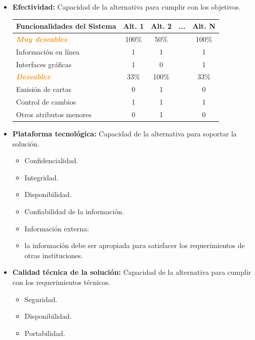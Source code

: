 \documentclass{templateNote}
\begin{document}
\begin{itemize}
    \item \textbf{Efectividad:} Capacidad de la alternativa para cumplir con los objetivos.
    \begin{table}[H]
        \centering
        \begin{tabular}{|>{\centering\arraybackslash}m{6cm}|c|c|c|c|}
            \hline
            \textbf{Funcionalidades del Sistema} & \textbf{Alt. 1} & \textbf{Alt. 2} & \textbf{  ...  } & \textbf{Alt. N} \\
            \hline
            \textcolor{darkorange}{\textbf{\textit{Muy deseables}}} & 100\% & 50\% & & 100\% \\
            Información en línea & 1 & 1 & & 1 \\
            Interfaces gráficas & 1 & 0 & & 1 \\
            \hline
            \textcolor{darkorange}{\textbf{\textit{Deseables}}} & 33\% & 100\% & & 33\% \\
            Emisión de cartas & 0 & 1 & & 0 \\
            Control de cambios & 1 & 1 & & 1 \\
            Otros atributos menores & 0 & 1 & & 0 \\
            \hline
        \end{tabular}
    \end{table}
    \item \textbf{Plataforma tecnológica:} Capacidad de la alternativa para soportar la solución.
    \begin{itemize}
        \item Confidencialidad.
        \item Integridad.
        \item Disponibilidad.
        \item Confiabilidad de la información.
        \item Información externa:
        \item la información debe ser apropiada para satisfacer los requerimientos de otras instituciones.
    \end{itemize}
    \item \textbf{Calidad técnica de la solución:} Capacidad de la alternativa para cumplir con los requerimientos técnicos.
    \begin{itemize}
        \item Seguridad.
        \item Disponibilidad.
        \item Portabilidad.

\end{itemize}
\end{itemize}
\end{document}
